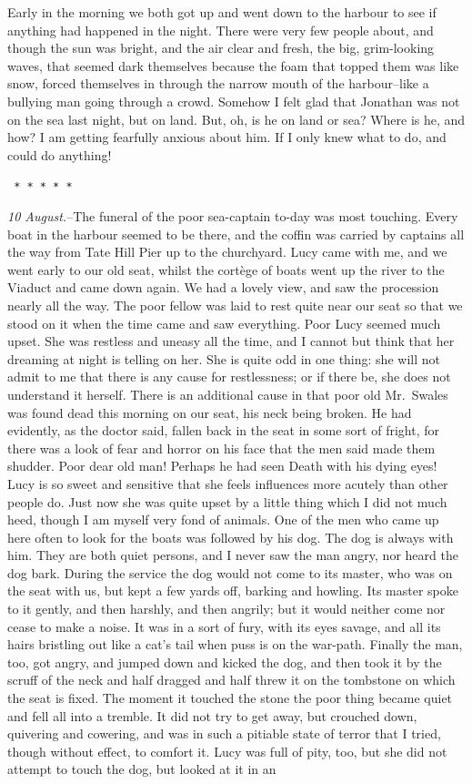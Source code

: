 \documentclass[12pt,openright]{book}
\begin{document}
Early in the morning we both got up and went down to the harbour to see if anything had happened in the night. There were very few people about, and though the sun was bright, and the air clear and fresh, the big, grim-looking waves, that seemed dark themselves because the foam that topped them was like snow, forced themselves in through the narrow mouth of the harbour–like a bullying man going through a crowd. Somehow I felt glad that Jonathan was not on the sea last night, but on land. But, oh, is he on land or sea? Where is he, and how? I am getting fearfully anxious about him. If I only knew what to do, and could do anything!

\texttt{   *       *       *       *       *}

\textit{10 August.}–The funeral of the poor sea-captain to-day was most touching. Every boat in the harbour seemed to be there, and the coffin was carried by captains all the way from Tate Hill Pier up to the churchyard. Lucy came with me, and we went early to our old seat, whilst the cortège of boats went up the river to the Viaduct and came down again. We had a lovely view, and saw the procession nearly all the way. The poor fellow was laid to rest quite near our seat so that we stood on it when the time came and saw everything. Poor Lucy seemed much upset. She was restless and uneasy all the time, and I cannot but think that her dreaming at night is telling on her. She is quite odd in one thing: she will not admit to me that there is any cause for restlessness; or if there be, she does not understand it herself. There is an additional cause in that poor old Mr. Swales was found dead this morning on our seat, his neck being broken. He had evidently, as the doctor said, fallen back in the seat in some sort of fright, for there was a look of fear and horror on his face that the men said made them shudder. Poor dear old man! Perhaps he had seen Death with his dying eyes! Lucy is so sweet and sensitive that she feels influences more acutely than other people do. Just now she was quite upset by a little thing which I did not much heed, though I am myself very fond of animals. One of the men who came up here often to look for the boats was followed by his dog. The dog is always with him. They are both quiet persons, and I never saw the man angry, nor heard the dog bark. During the service the dog would not come to its master, who was on the seat with us, but kept a few yards off, barking and howling. Its master spoke to it gently, and then harshly, and then angrily; but it would neither come nor cease to make a noise. It was in a sort of fury, with its eyes savage, and all its hairs bristling out like a cat’s tail when puss is on the war-path. Finally the man, too, got angry, and jumped down and kicked the dog, and then took it by the scruff of the neck and half dragged and half threw it on the tombstone on which the seat is fixed. The moment it touched the stone the poor thing became quiet and fell all into a tremble. It did not try to get away, but crouched down, quivering and cowering, and was in such a pitiable state of terror that I tried, though without effect, to comfort it. Lucy was full of pity, too, but she did not attempt to touch the dog, but looked at it in an 
\end{document}
